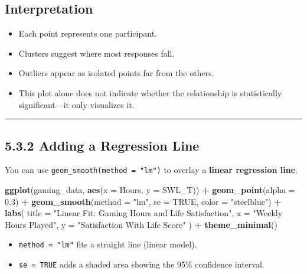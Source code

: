 \documentclass[
]{book}
\newenvironment{Shaded}{\begin{snugshade}}{\end{snugshade}}
\newcommand{\AttributeTok}[1]{\textcolor[rgb]{0.13,0.29,0.53}{#1}}
\newcommand{\ConstantTok}[1]{\textcolor[rgb]{0.56,0.35,0.01}{#1}}
\newcommand{\FloatTok}[1]{\textcolor[rgb]{0.00,0.00,0.81}{#1}}
\newcommand{\FunctionTok}[1]{\textcolor[rgb]{0.13,0.29,0.53}{\textbf{#1}}}
\newcommand{\NormalTok}[1]{#1}
\newcommand{\SpecialCharTok}[1]{\textcolor[rgb]{0.81,0.36,0.00}{\textbf{#1}}}
\newcommand{\StringTok}[1]{\textcolor[rgb]{0.31,0.60,0.02}{#1}}
\providecommand{\tightlist}{%
  \setlength{\itemsep}{0pt}\setlength{\parskip}{0pt}}
\begin{document}
\subsection{Interpretation}\label{interpretation-11}

\begin{itemize}
\tightlist
\item
  Each point represents one participant.
\item
  Clusters suggest where most responses fall.
\item
  Outliers appear as isolated points far from the others.
\item
  This plot alone does not indicate whether the relationship is statistically significant---it only visualizes it.
\end{itemize}

\begin{center}\rule{0.5\linewidth}{0.5pt}\end{center}

\subsection{5.3.2 Adding a Regression Line}\label{adding-a-regression-line}

You can use \texttt{geom\_smooth(method\ =\ "lm")} to overlay a \textbf{linear regression line}.

\begin{Shaded}
\begin{Highlighting}[]
\FunctionTok{ggplot}\NormalTok{(gaming\_data, }\FunctionTok{aes}\NormalTok{(}\AttributeTok{x =}\NormalTok{ Hours, }\AttributeTok{y =}\NormalTok{ SWL\_T)) }\SpecialCharTok{+}
  \FunctionTok{geom\_point}\NormalTok{(}\AttributeTok{alpha =} \FloatTok{0.3}\NormalTok{) }\SpecialCharTok{+}
  \FunctionTok{geom\_smooth}\NormalTok{(}\AttributeTok{method =} \StringTok{"lm"}\NormalTok{, }\AttributeTok{se =} \ConstantTok{TRUE}\NormalTok{, }\AttributeTok{color =} \StringTok{"steelblue"}\NormalTok{) }\SpecialCharTok{+}
  \FunctionTok{labs}\NormalTok{(}
    \AttributeTok{title =} \StringTok{"Linear Fit: Gaming Hours and Life Satisfaction"}\NormalTok{,}
    \AttributeTok{x =} \StringTok{"Weekly Hours Played"}\NormalTok{,}
    \AttributeTok{y =} \StringTok{"Satisfaction With Life Score"}
\NormalTok{  ) }\SpecialCharTok{+}
  \FunctionTok{theme\_minimal}\NormalTok{()}
\end{Highlighting}
\end{Shaded}

\begin{itemize}
\tightlist
\item
  \texttt{method\ =\ "lm"} fits a straight line (linear model).
\item
  \texttt{se\ =\ TRUE} adds a shaded area showing the 95\% confidence interval.
\end{itemize}
\end{document}
